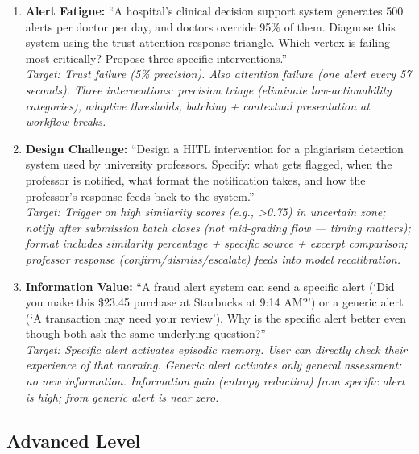 \begin{enumerate}
    \item \textbf{Alert Fatigue:} ``A hospital's clinical decision support system generates 500 alerts per doctor per day, and doctors override 95\% of them. Diagnose this system using the trust-attention-response triangle. Which vertex is failing most critically? Propose three specific interventions.''\\
    \textit{Target: Trust failure (5\% precision). Also attention failure (one alert every 57 seconds). Three interventions: precision triage (eliminate low-actionability categories), adaptive thresholds, batching + contextual presentation at workflow breaks.}

    \item \textbf{Design Challenge:} ``Design a HITL intervention for a plagiarism detection system used by university professors. Specify: what gets flagged, when the professor is notified, what format the notification takes, and how the professor's response feeds back to the system.''\\
    \textit{Target: Trigger on high similarity scores (e.g., >0.75) in uncertain zone; notify after submission batch closes (not mid-grading flow --- timing matters); format includes similarity percentage + specific source + excerpt comparison; professor response (confirm/dismiss/escalate) feeds into model recalibration.}

    \item \textbf{Information Value:} ``A fraud alert system can send a specific alert (`Did you make this \$23.45 purchase at Starbucks at 9:14 AM?') or a generic alert (`A transaction may need your review'). Why is the specific alert better even though both ask the same underlying question?''\\
    \textit{Target: Specific alert activates episodic memory. User can directly check their experience of that morning. Generic alert activates only general assessment: no new information. Information gain (entropy reduction) from specific alert is high; from generic alert is near zero.}
\end{enumerate}

\subsection{Advanced Level}

